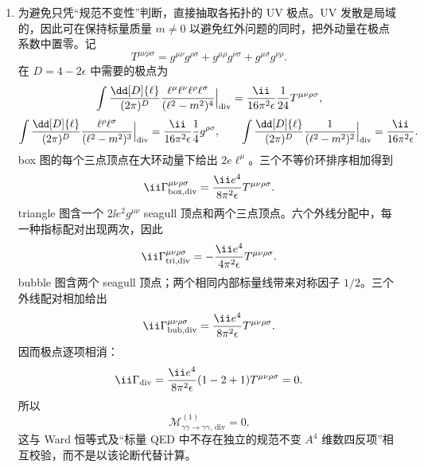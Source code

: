 \begin{question}[30 分]
\begin{solution}
\begin{enumerate}
  \item 为避免只凭“规范不变性”判断，直接抽取各拓扑的 UV 极点。UV 发散是局域的，因此可在保持标量质量 $m\neq0$ 以避免红外问题的同时，把外动量在极点系数中置零。记
  \[
  T^{\mu\nu\rho\sigma}=g^{\mu\nu}g^{\rho\sigma}
  +g^{\mu\rho}g^{\nu\sigma}+g^{\mu\sigma}g^{\nu\rho}.
  \]
  在 $D=4-2\epsilon$ 中需要的极点为
  \[
  \int\frac{\dd[D]{\ell}}{(2\pi)^D}
  \frac{\ell^\mu\ell^\nu\ell^\rho\ell^\sigma}{(\ell^2-m^2)^4}
  \Big|_{\rm div}
  =\frac{\ii}{16\pi^2\epsilon}\frac1{24}
  T^{\mu\nu\rho\sigma},
  \]
  \[
  \int\frac{\dd[D]{\ell}}{(2\pi)^D}
  \frac{\ell^\rho\ell^\sigma}{(\ell^2-m^2)^3}
  \Big|_{\rm div}
  =\frac{\ii}{16\pi^2\epsilon}\frac14g^{\rho\sigma},
  \qquad
  \int\frac{\dd[D]{\ell}}{(2\pi)^D}
  \frac1{(\ell^2-m^2)^2}
  \Big|_{\rm div}
  =\frac{\ii}{16\pi^2\epsilon}.
  \]
  box 图的每个三点顶点在大环动量下给出 $2e\ell^\mu$。三个不等价环排序相加得到
  \[
  \ii\Gamma_{\rm box,div}^{\mu\nu\rho\sigma}
  =\frac{\ii e^4}{8\pi^2\epsilon}T^{\mu\nu\rho\sigma}.
  \]
  triangle 图含一个 $2\ii e^2g^{\mu\nu}$ seagull 顶点和两个三点顶点。六个外线分配中，每一种指标配对出现两次，因此
  \[
  \ii\Gamma_{\rm tri,div}^{\mu\nu\rho\sigma}
  =-\frac{\ii e^4}{4\pi^2\epsilon}T^{\mu\nu\rho\sigma}.
  \]
  bubble 图含两个 seagull 顶点；两个相同内部标量线带来对称因子 $1/2$。三个外线配对相加给出
  \[
  \ii\Gamma_{\rm bub,div}^{\mu\nu\rho\sigma}
  =\frac{\ii e^4}{8\pi^2\epsilon}T^{\mu\nu\rho\sigma}.
  \]
  因而极点逐项相消：
  \[
  \ii\Gamma_{\rm div}
  =\frac{\ii e^4}{8\pi^2\epsilon}(1-2+1)
  T^{\mu\nu\rho\sigma}=0.
  \]
  所以
  \[
  \boxed{\mathcal M^{(1)}_{\gamma\gamma\to\gamma\gamma,\,\mathrm{div}}=0}.
  \]
  这与 Ward 恒等式及“标量 QED 中不存在独立的规范不变 $A^4$ 维数四反项”相互校验，而不是以该论断代替计算。
\end{enumerate}
\end{solution}
\end{question}

